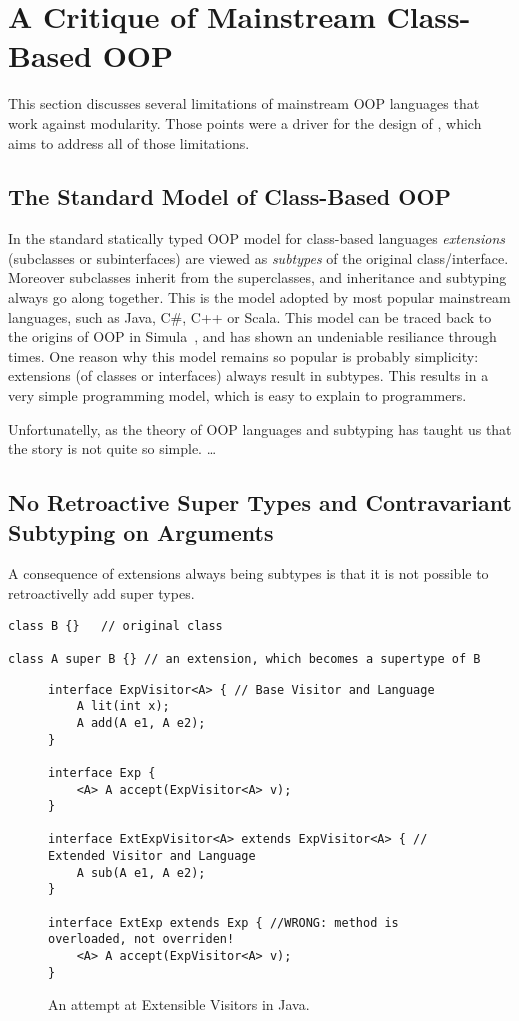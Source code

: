 \section{A Critique of Mainstream Class-Based OOP}

This section discusses several limitations of mainstream OOP languages
that work against modularity. Those points were a driver for the
design of \name, which aims to address all of those limitations. 

\subsection{The Standard Model of Class-Based OOP}

In the standard statically typed OOP model for class-based languages
\emph{extensions} (subclasses or subinterfaces) are viewed as \emph{subtypes} of the original
class/interface. Moreover subclasses inherit from the superclasses,
and inheritance and subtyping always go along together.
This is the model adopted by most popular mainstream
languages, such as Java, C\#, C++ or Scala. This model can be traced
back to the origins of OOP in Simula~\cite{}, and has shown an 
undeniable resiliance through times. One reason why this model remains 
so popular is probably simplicity: 
extensions (of classes or interfaces) always result in subtypes.  
This results in a very simple programming model, which is easy 
to explain to programmers.  

Unfortunatelly, as the theory of OOP languages and subtyping has taught 
us that the story is not quite so simple.  \ldots

\subsection{No Retroactive Super Types and Contravariant Subtyping on Arguments}

A consequence of extensions always being subtypes is that it is not
possible to retroactivelly add super types. 

\begin{lstlisting}
class B {}   // original class

class A super B {} // an extension, which becomes a supertype of B
\end{lstlisting}

\begin{figure}
\begin{lstlisting}
interface ExpVisitor<A> { // Base Visitor and Language
	A lit(int x);
	A add(A e1, A e2);
}

interface Exp {
	<A> A accept(ExpVisitor<A> v);
}

interface ExtExpVisitor<A> extends ExpVisitor<A> { // Extended Visitor and Language
	A sub(A e1, A e2);
}

interface ExtExp extends Exp { //WRONG: method is overloaded, not overriden!
	<A> A accept(ExpVisitor<A> v); 
}
\end{lstlisting}
\caption{An attempt at Extensible Visitors in Java.}
\label{fig:JVis}
\end{figure}


